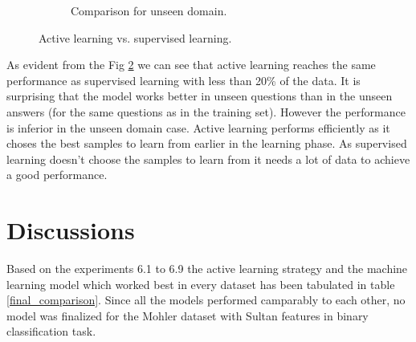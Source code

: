 \begin{figure}[!htb]
\begin{subfigure}[b]{0.44\textwidth}
		\caption{Comparison for unseen domain.}
		\label{unseen_dom}
	\end{subfigure}
	\caption{Active learning vs. supervised learning.}
	\label{al_vs_sl}
\end{figure}

As evident from the Fig \ref{al_vs_sl} we can see that active learning reaches the same performance as supervised learning with less than 20\% of the data. It is surprising that the model works better in unseen questions than in the unseen answers (for the same questions as in the training set). However the performance is inferior in the unseen domain case. Active learning performs efficiently as it choses the best samples to learn from earlier in the learning phase. As supervised learning doesn't choose the samples to learn from it needs a lot of data to achieve a good performance. 

\clearpage

\section{Discussions}

Based on the experiments 6.1 to 6.9 the active learning strategy and the machine learning model which worked best in every dataset has been tabulated in table \ref{final_comparison}. Since all the models performed camparably to each other, no model was finalized for the Mohler dataset with Sultan features in binary classification task. 

